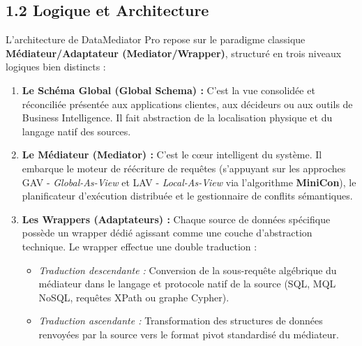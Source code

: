 \documentclass[11pt,a4paper]{article}
\begin{document}
\subsection{1.2 Logique et Architecture}
L'architecture de DataMediator Pro repose sur le paradigme classique \textbf{Médiateur/Adaptateur (Mediator/Wrapper)}, structuré en trois niveaux logiques bien distincts :

\begin{enumerate}
    \item \textbf{Le Schéma Global (Global Schema) :} C'est la vue consolidée et réconciliée présentée aux applications clientes, aux décideurs ou aux outils de Business Intelligence. Il fait abstraction de la localisation physique et du langage natif des sources.
    \item \textbf{Le Médiateur (Mediator) :} C'est le cœur intelligent du système. Il embarque le moteur de réécriture de requêtes (s'appuyant sur les approches GAV - \textit{Global-As-View} et LAV - \textit{Local-As-View} via l'algorithme \textbf{MiniCon}), le planificateur d'exécution distribuée et le gestionnaire de conflits sémantiques.
    \item \textbf{Les Wrappers (Adaptateurs) :} Chaque source de données spécifique possède un wrapper dédié agissant comme une couche d'abstraction technique. Le wrapper effectue une double traduction :
    \begin{itemize}
        \item \textit{Traduction descendante :} Conversion de la sous-requête algébrique du médiateur dans le langage et protocole natif de la source (SQL, MQL NoSQL, requêtes XPath ou graphe Cypher).
        \item \textit{Traduction ascendante :} Transformation des structures de données renvoyées par la source vers le format pivot standardisé du médiateur.
    \end{itemize}
\end{enumerate}
\end{document}
